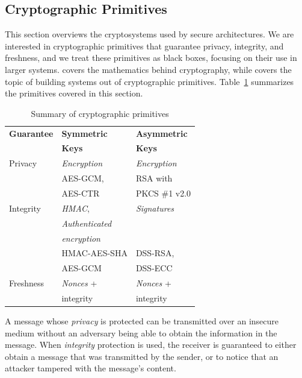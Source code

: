 \subsection{Cryptographic Primitives}
\label{sec:crypto_primitives}

This section overviews the cryptosystems used by secure architectures. We are
interested in cryptographic primitives that guarantee privacy, integrity, and
freshness, and we treat these primitives as black boxes, focusing on their use
in larger systems. \cite{katz2014crypto} covers the mathematics behind
cryptography, while \cite{ferguson2011crypto} covers the topic of building
systems out of cryptographic primitives. Table~\ref{fig:crypto_primitives}
summarizes the primitives covered in this section.

\begin{table}[hbt]
  \centering
  \begin{tabular}{| l | l | l |}
  \hline
  \textbf{Guarantee} & \textbf{Symmetric} & \textbf{Asymmetric} \\
                     & \textbf{Keys} & \textbf{Keys} \\
  \hline
  Privacy & \textit{Encryption} & \textit{Encryption} \\
          & AES-GCM, & RSA with \\
          & AES-CTR  & PKCS \#1 v2.0 \\
  \hline
  Integrity & \textit{HMAC},   & \textit{Signatures} \\
            & \textit{Authenticated} & \\
            & \textit{encryption} & \\
            & HMAC-AES-SHA & DSS-RSA, \\
            & AES-GCM & DSS-ECC \\
  \hline
  Freshness & \textit{Nonces} + & \textit{Nonces} + \\
            & integrity & integrity \\
  \hline
  \end{tabular}
  \caption{
    Summary of cryptographic primitives
  }
  \label{fig:crypto_primitives}
\end{table}

A message whose \textit{privacy} is protected can be transmitted over an
insecure medium without an adversary being able to obtain the information in
the message. When \textit{integrity} protection is used, the receiver is
guaranteed to either obtain a message that was transmitted by the sender, or to
notice that an attacker tampered with the message's content.

